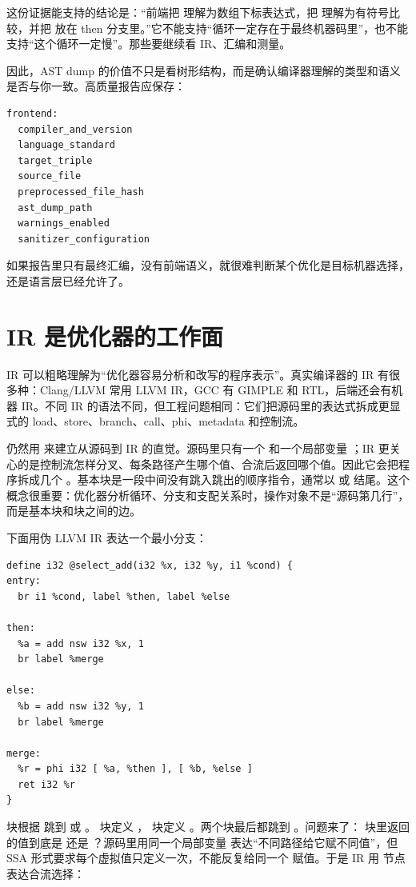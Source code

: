 这份证据能支持的结论是：“前端把  理解为数组下标表达式，把  理解为有符号比较，并把  放在 then 分支里。”它不能支持“循环一定存在于最终机器码里”，也不能支持“这个循环一定慢”。那些要继续看 IR、汇编和测量。

因此，AST dump 的价值不只是看树形结构，而是确认编译器理解的类型和语义是否与你一致。高质量报告应保存：

\begin{lstlisting}[numbers=none,caption={AST 证据字段}]
frontend:
  compiler_and_version
  language_standard
  target_triple
  source_file
  preprocessed_file_hash
  ast_dump_path
  warnings_enabled
  sanitizer_configuration
\end{lstlisting}

如果报告里只有最终汇编，没有前端语义，就很难判断某个优化是目标机器选择，还是语言层已经允许了。

\section{IR 是优化器的工作面}

IR 可以粗略理解为“优化器容易分析和改写的程序表示”。真实编译器的 IR 有很多种：Clang/LLVM 常用 LLVM IR，GCC 有 GIMPLE 和 RTL，后端还会有机器 IR。不同 IR 的语法不同，但工程问题相同：它们把源码里的表达式拆成更显式的 load、store、branch、call、phi、metadata 和控制流。

仍然用  来建立从源码到 IR 的直觉。源码里只有一个  和一个局部变量 ；IR 更关心的是控制流怎样分叉、每条路径产生哪个值、合流后返回哪个值。因此它会把程序拆成几个 。基本块是一段中间没有跳入跳出的顺序指令，通常以  或  结尾。这个概念很重要：优化器分析循环、分支和支配关系时，操作对象不是“源码第几行”，而是基本块和块之间的边。

下面用伪 LLVM IR 表达一个最小分支：

\begin{lstlisting}[numbers=none,caption={分支在 IR 中变成基本块和 phi}]
define i32 @select_add(i32 %x, i32 %y, i1 %cond) {
entry:
  br i1 %cond, label %then, label %else

then:
  %a = add nsw i32 %x, 1
  br label %merge

else:
  %b = add nsw i32 %y, 1
  br label %merge

merge:
  %r = phi i32 [ %a, %then ], [ %b, %else ]
  ret i32 %r
}
\end{lstlisting}

 块根据  跳到  或 。 块定义 ， 块定义 。两个块最后都跳到 。问题来了： 块里返回的值到底是  还是 ？源码里用同一个局部变量  表达“不同路径给它赋不同值”，但 SSA 形式要求每个虚拟值只定义一次，不能反复给同一个  赋值。于是 IR 用  节点表达合流选择：

